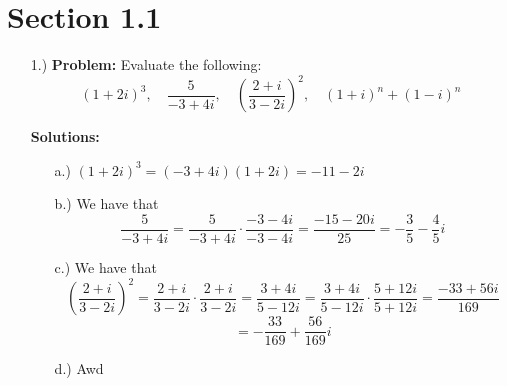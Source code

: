 \documentclass[12pt]{article}
\newcommand{\parens}[1]{\left( #1 \right)}
\begin{document}
    \pagestyle{fancy}

    \section*{Section 1.1}

    \begin{itemize}
        \item [1.)] \textbf{Problem:} Evaluate the following:
        \[
            (1 + 2i)^3, \quad
            \frac{5}{-3 + 4i}, \quad
            \parens{ \frac{2 + i}{3 - 2i} }^2, \quad
            (1 + i)^n + (1 - i)^n
        \]

        \textbf{Solutions:}

        \begin{itemize}
            \item [a.)] \( (1 + 2i)^3 = (-3 + 4i)(1 + 2i) = -11 - 2i \)
            
            \item [b.)] We have that
            \[
                \frac{5}{-3 + 4i} =
                \frac{5}{-3 + 4i} \cdot \frac{-3 - 4i}{-3 - 4i} =
                \frac{-15 - 20i}{25} =
                -\frac{3}{5} - \frac{4}{5}i
            \]

            \item [c.)] We have that
            \[
                \parens{\frac{2 + i}{3 - 2i}}^2 =
                \frac{2 + i}{3 - 2i} \cdot \frac{2 + i}{3 - 2i} =
                \frac{3 + 4i}{5 - 12i} = 
                \frac{3 + 4i}{5 - 12i} \cdot \frac{5 + 12i}{5 + 12i} =
                \frac{-33 + 56i}{169}
            \]
            \[ = -\frac{33}{169} + \frac{56}{169}i \]

            \item [d.)] Awd
        \end{itemize}
    \end{itemize}
\end{document}
